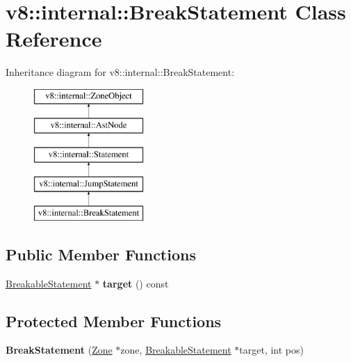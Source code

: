 \hypertarget{classv8_1_1internal_1_1_break_statement}{}\section{v8\+:\+:internal\+:\+:Break\+Statement Class Reference}
\label{classv8_1_1internal_1_1_break_statement}
Inheritance diagram for v8\+:\+:internal\+:\+:Break\+Statement\+:\begin{figure}[H]
\begin{center}
\leavevmode
\includegraphics[height=5.000000cm]{classv8_1_1internal_1_1_break_statement}
\end{center}
\end{figure}
\subsection*{Public Member Functions}
\begin{DoxyCompactItemize}
\item 
\hyperlink{classv8_1_1internal_1_1_breakable_statement}{Breakable\+Statement} $\ast$ {\bfseries target} () const \hypertarget{classv8_1_1internal_1_1_break_statement_a257c45672effe823b2c60e77a3967479}{}\label{classv8_1_1internal_1_1_break_statement_a257c45672effe823b2c60e77a3967479}

\end{DoxyCompactItemize}
\subsection*{Protected Member Functions}
\begin{DoxyCompactItemize}
\item 
{\bfseries Break\+Statement} (\hyperlink{classv8_1_1internal_1_1_zone}{Zone} $\ast$zone, \hyperlink{classv8_1_1internal_1_1_breakable_statement}{Breakable\+Statement} $\ast$target, int pos)\hypertarget{classv8_1_1internal_1_1_break_statement_a095b8fd4adcb738a0a7b081b9cc44efe}{}\label{classv8_1_1internal_1_1_break_statement_a095b8fd4adcb738a0a7b081b9cc44efe}

\end{DoxyCompactItemize}
